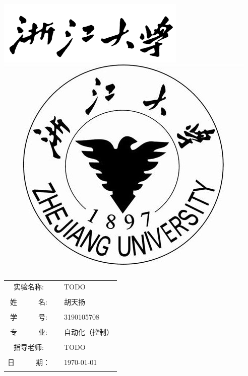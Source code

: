 \documentclass[UTF8, a4paper]{ctexart}
\begin{document}
\begin{center}
    \ \\[60pt]
	\includegraphics[scale=0.8]{logo.png}\\[40pt]
    \includegraphics[scale=1.5]{LOGO.jpg}\\[80pt]
	\begin{tabular}{cl}
		实验名称:~~& TODO\\
		\cline{2-2}\\
		姓~~~~~~名:~~& 胡天扬\\
		\cline{2-2}\\
		学~~~~~~号:~~& 3190105708\\
		\cline{2-2}\\
		专~~~~~~业:~~& 自动化（控制）\\
		\cline{2-2}\\
		指导老师:~~& TODO\\
		\cline{2-2}\\
		日~~~~~~期：~~&\today\\ 
		\cline{2-2}\\
	\end{tabular}
\end{center}
\end{document}

